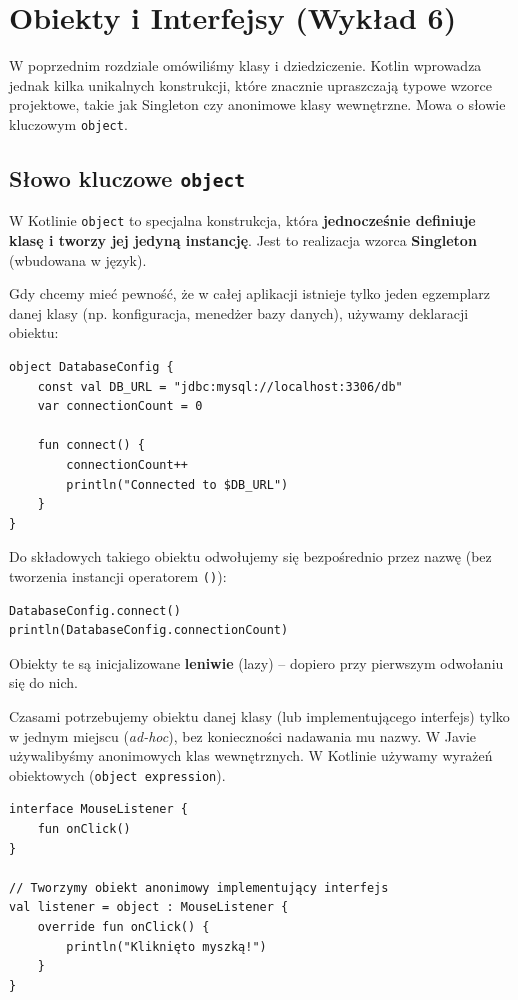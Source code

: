 \chapter{Obiekty i Interfejsy (Wykład 6)}

W poprzednim rozdziale omówiliśmy klasy i dziedziczenie. Kotlin wprowadza jednak kilka unikalnych konstrukcji, które znacznie upraszczają typowe wzorce projektowe, takie jak Singleton czy anonimowe klasy wewnętrzne. Mowa o słowie kluczowym \texttt{object}.

\section{Słowo kluczowe \texttt{object}}

W Kotlinie \texttt{object} to specjalna konstrukcja, która \textbf{jednocześnie definiuje klasę i tworzy jej jedyną instancję}. Jest to realizacja wzorca \textbf{Singleton} (wbudowana w język).

Gdy chcemy mieć pewność, że w całej aplikacji istnieje tylko jeden egzemplarz danej klasy (np. konfiguracja, menedżer bazy danych), używamy deklaracji obiektu:

\begin{verbatim}
object DatabaseConfig {
    const val DB_URL = "jdbc:mysql://localhost:3306/db"
    var connectionCount = 0

    fun connect() {
        connectionCount++
        println("Connected to $DB_URL")
    }
}
\end{verbatim}

Do składowych takiego obiektu odwołujemy się bezpośrednio przez nazwę (bez tworzenia instancji operatorem \texttt{()}):

\begin{verbatim}
DatabaseConfig.connect()
println(DatabaseConfig.connectionCount)
\end{verbatim}

Obiekty te są inicjalizowane \textbf{leniwie} (lazy) – dopiero przy pierwszym odwołaniu się do nich.

Czasami potrzebujemy obiektu danej klasy (lub implementującego interfejs) tylko w jednym miejscu (\textit{ad-hoc}), bez konieczności nadawania mu nazwy. W Javie używalibyśmy anonimowych klas wewnętrznych. W Kotlinie używamy wyrażeń obiektowych (\texttt{object expression}).

\begin{verbatim}
interface MouseListener {
    fun onClick()
}

// Tworzymy obiekt anonimowy implementujący interfejs
val listener = object : MouseListener {
    override fun onClick() {
        println("Kliknięto myszką!")
    }
}
\end{verbatim}

